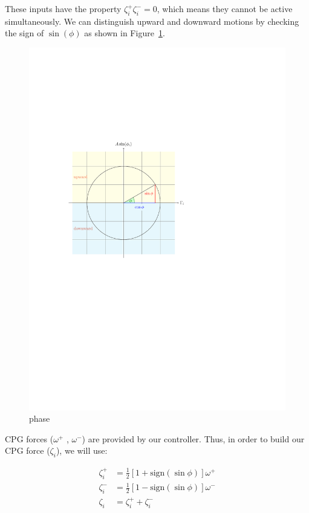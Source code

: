 \documentclass{article}
\begin{document}
These inputs have the property $\zeta_i^+  \zeta_i^- = 0$, which means they cannot be active simultaneously. We can distinguish upward and downward motions by checking the sign of $\sin(\phi)$ as shown in Figure~\ref{fig:phase_plot}.

\begin{figure}[thpb]
	\centering
		\centering
		\includegraphics[scale = 0.7]{phase_plot_cropped.pdf}
		\centering
		\caption{phase}
		\label{fig:phase_plot}
\end{figure}

CPG forces ($\omega^+$ , $\omega^-$) are provided by our controller. Thus, in order to build our CPG force ($\zeta_i$), we will use: 

\begin{align}\label{eq:spliting}
	\zeta_i^+ &= \frac{1}{2}[1+ \mathrm{sign}(\sin\phi)] \omega^+\\
	\zeta_i^- &= \frac{1}{2}[1- \mathrm{sign}(\sin\phi)] \omega^-\\
	\zeta_i &= \zeta_i^+ + \zeta_i^-
\end{align}
\end{document}
